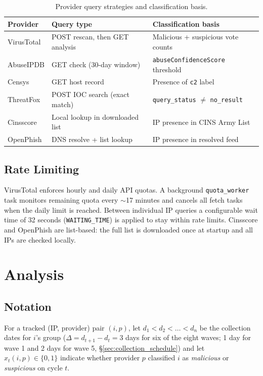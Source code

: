 \documentclass[12pt, a4paper, twoside]{report}
\begin{document}
\begin{table}[h]
  \centering
  \caption{Provider query strategies and classification basis.}
  \label{tab:provider_queries}
  \begin{tabularx}{\linewidth}{lXX}
    \toprule
    \textbf{Provider} & \textbf{Query type} & \textbf{Classification basis} \\
    \midrule
    VirusTotal  & POST rescan, then GET analysis & Malicious + suspicious vote counts \\
    AbuseIPDB   & GET check (30-day window)       & \texttt{abuseConfidenceScore} threshold \\
    Censys      & GET host record                 & Presence of \texttt{c2} label \\
    ThreatFox   & POST IOC search (exact match)   & \texttt{query\_status} $\neq$ \texttt{no\_result} \\
    Cinsscore   & Local lookup in downloaded list & IP presence in CINS Army List \\
    OpenPhish   & DNS resolve + list lookup       & IP presence in resolved feed \\
    \bottomrule
  \end{tabularx}
\end{table}

\subsection{Rate Limiting}
\label{sec:rate_limiting}

VirusTotal enforces hourly and daily API quotas. A background \texttt{quota\_worker} task monitors
remaining quota every $\sim$17 minutes and cancels all fetch tasks when the daily limit is reached.
Between individual IP queries a configurable wait time of 32 seconds (\texttt{WAITING\_TIME}) is
applied to stay within rate limits. Cinsscore and OpenPhish are list-based: the full list is
downloaded once at startup and all IPs are checked locally.

\section{Analysis}

\subsection{Notation}
\label{sec:notation}

For a tracked (IP, provider) pair $(i,p)$, let $d_1 < d_2 < \dots < d_n$ be the collection dates for
$i$'s group ($\Delta = d_{t+1}-d_t = 3$ days for six of the eight waves; 1 day for wave 1 and 2 days
for wave 5, \S\ref{sec:collection_schedule}) and let
$x_t(i,p) \in \{0,1\}$ indicate whether provider $p$ classified $i$ as \emph{malicious} or
\emph{suspicious} on cycle $t$.
\end{document}
